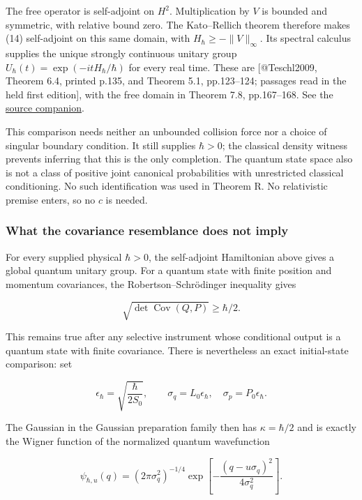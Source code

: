 \documentclass[11pt,a4paper]{article}
\begin{document}
The free operator is self-adjoint on \(H^2\). Multiplication by \(V\) is
bounded and symmetric, with relative bound zero. The Kato--Rellich
theorem therefore makes (14) self-adjoint on this same domain, with
\(H_\hbar\ge-\|V\|_\infty\). Its spectral calculus supplies the unique
strongly continuous unitary group \(U_\hbar(t)=\exp(-itH_\hbar/\hbar)\)
for every real time. These are {[}@Teschl2009, Theorem 6.4, printed
p.135, and Theorem 5.1, pp.123--124; passages read in the held first
edition{]}, with the free domain in Theorem 7.8, pp.167--168. See the
\href{../docs/Teschl_QuantumMechanics_2009.md}{source companion}.

This comparison needs neither an unbounded collision force nor a choice
of singular boundary condition. It still supplies \(\hbar>0\); the
classical density witness prevents inferring that this is the only
completion. The quantum state space also is not a class of positive
joint canonical probabilities with unrestricted classical conditioning.
No such identification was used in Theorem R. No relativistic premise
enters, so no \(c\) is needed.

\hypertarget{what-the-covariance-resemblance-does-not-imply}{%
\subsubsection{What the covariance resemblance does not
imply}\label{what-the-covariance-resemblance-does-not-imply}}

For every supplied physical \(\hbar>0\), the self-adjoint Hamiltonian
above gives a global quantum unitary group. For a quantum state with
finite position and momentum covariances, the Robertson--Schrödinger
inequality gives

\[
 \sqrt{\det\operatorname{Cov}(Q,P)}\ge\hbar/2. \tag{Q15}
\]

This remains true after any selective instrument whose conditional
output is a quantum state with finite covariance. There is nevertheless
an exact initial-state comparison: set

\[
 \epsilon_\hbar=\sqrt{\frac{\hbar}{2S_0}},\qquad
 \sigma_q=L_0\epsilon_\hbar,\quad
 \sigma_p=P_0\epsilon_\hbar. \tag{Q15a}
\]

The Gaussian in the Gaussian preparation family then has
\(\kappa=\hbar/2\) and is exactly the Wigner function of the normalized
quantum wavefunction

\[
 \psi_{\hbar,u}(q)=(2\pi\sigma_q^2)^{-1/4}
 \exp\!\left[-\frac{(q-u\sigma_q)^2}{4\sigma_q^2}\right]. \tag{Q15b}
\]
\end{document}
